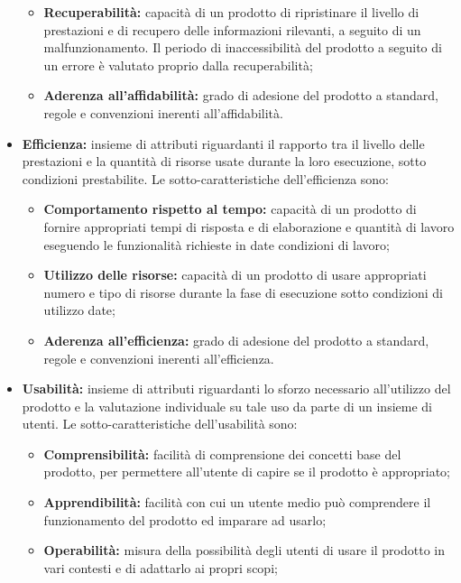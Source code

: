 \begin{itemize}
\begin{itemize}
              \item \textbf{Recuperabilità:} capacità di un prodotto di ripristinare il livello di prestazioni e di recupero delle informazioni rilevanti, a seguito di un malfunzionamento. Il periodo di inaccessibilità del prodotto a seguito di un errore è valutato proprio dalla recuperabilità;
              \item \textbf{Aderenza all'affidabilità:} grado di adesione del prodotto a standard, regole e convenzioni inerenti all'affidabilità.
          \end{itemize}
    \item \textbf{Efficienza:} insieme di attributi riguardanti il rapporto tra il livello delle prestazioni e la quantità di risorse usate durante la loro esecuzione, sotto condizioni prestabilite.
          Le sotto-caratteristiche dell'efficienza sono:
          \begin{itemize}
              \item \textbf{Comportamento rispetto al tempo:} capacità di un prodotto di fornire appropriati tempi di risposta e di elaborazione e quantità di lavoro eseguendo le funzionalità richieste in date condizioni di lavoro;
              \item \textbf{Utilizzo delle risorse:} capacità di un prodotto di usare appropriati numero e tipo di risorse durante la fase di esecuzione sotto condizioni di utilizzo date;
              \item \textbf{Aderenza all'efficienza:} grado di adesione del prodotto a standard, regole e convenzioni inerenti all'efficienza.
          \end{itemize}
    \item \textbf{Usabilità:} insieme di attributi riguardanti lo sforzo necessario all'utilizzo del prodotto e la valutazione individuale su tale uso da parte di un insieme di utenti.
          Le sotto-caratteristiche dell'usabilità sono:
          \begin{itemize}
              \item \textbf{Comprensibilità:} facilità di comprensione dei concetti base del prodotto, per permettere all'utente di capire se il prodotto è appropriato;
              \item \textbf{Apprendibilità:} facilità con cui un utente medio può comprendere il funzionamento del prodotto ed imparare ad usarlo;
              \item \textbf{Operabilità:} misura della possibilità degli utenti di usare il prodotto in vari contesti e di adattarlo ai propri scopi;

\end{itemize}
\end{itemize}

